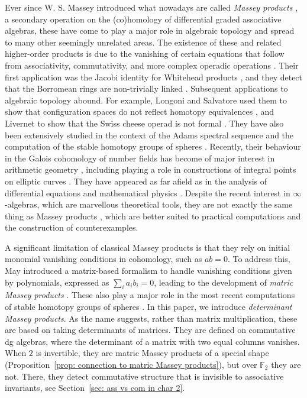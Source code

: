 \documentclass[11pt]{article}
\theoremstyle{definition}
\theoremstyle{definition}
\begin{document}
Ever since W. S. Massey introduced what nowadays are called \emph{Massey products} \cite{UeharaMassey57,Massey58}, 
a secondary operation on the (co)homology of differential graded associative algebras,
these have come to play a major role in algebraic topology and spread to many other seemingly unrelated areas.
The existence of these and related higher-order products is due to the vanishing of certain equations
that follow from associativity, commutativity, and more complex operadic operations \cite{muro23, operadicmassey}. 
Their first application was the Jacobi identity for Whitehead products \cite{UeharaMassey57},
and they detect that the Borromean rings are non-trivially linked \cite{Mas69,Mas98}.
Subsequent applications to algebraic topology abound. 
For example, Longoni and Salvatore used them to show 
that configuration spaces do not reflect homotopy equivalences \cite{Longoni05},
and Livernet to show that the Swiss cheese operad is not formal \cite{livernet15}. 
They have also been extensively studied in the context of the Adams spectral sequence 
and the computation of the stable homotopy groups of spheres \cite{Isaksen20, Kochman80}. 
Recently, their behaviour in the Galois cohomology of number fields has become of major interest in arithmetic geometry
\cite{EM17, HW15, GMT18, HW19, MT15b, MT16}, including playing a role in constructions of integral points on elliptic curves \cite{Minhyong10}. 
They have appeared as far afield as in the analysis of differential equations \cite{Reyesetal} and mathematical physics \cite{Bruinsma}.
Despite the recent interest in $\infty$-algebras,
which are marvellous theoretical tools,
they are not exactly the same thing as Massey products \cite{jose20, operadicmassey}, 
which are better suited to practical computations and the construction of counterexamples.

\smallskip

A significant limitation of classical Massey products is that they rely on initial monomial vanishing conditions in cohomology, 
such as \( ab = 0 \). To address this, May introduced a matrix-based formalism to handle vanishing conditions given by polynomials,
expressed as \( \sum_i a_i b_i = 0 \), 
leading to the development of \emph{matric Massey products} \cite{May69}.
These also play a major role in the most recent computations of stable homotopy groups of spheres \cite{gheorge21}. 
In this paper, we introduce \emph{determinant Massey products}.
As the name suggests, rather than matrix multiplication, 
these are based on taking determinants of matrices.
They are defined on commutative dg algebras, 
where the determinant of a matrix with two equal columns vanishes.
When $2$ is invertible, they are matric Massey products of a special shape
(Proposition~\ref{prop: connection to matric Massey products}), 
but over $\mathbb F_2$ they are not. 
There, they detect commutative structure that is invisible to associative invariants,
see Section~\ref{sec: ass vs com in char 2}.
\end{document}
